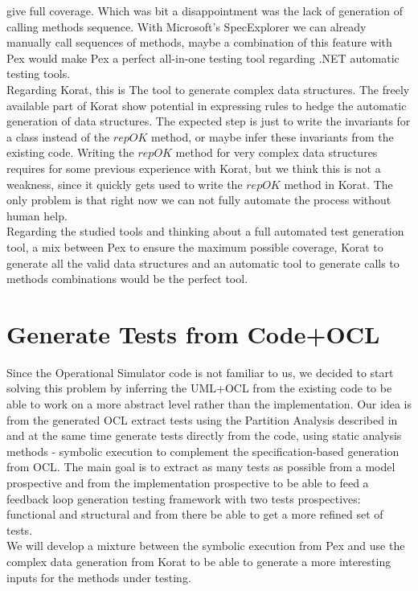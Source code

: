 \documentclass[10pt, conference, compsocconf]{IEEEtran}
\begin{document}
give full coverage. Which was bit a disappointment was the lack of generation of calling methods sequence. With Microsoft's SpecExplorer we can already
manually call sequences of methods, maybe a combination of this feature with Pex would make Pex a perfect all-in-one testing tool regarding .NET automatic testing tools.\\
Regarding Korat, this is The tool to generate complex data structures. The freely available part of Korat show potential in expressing rules to hedge
the automatic generation of data structures. The expected step is just to write the invariants for a class instead of the $repOK$ method, or maybe infer these invariants 
from the existing code. Writing the $repOK$ method for very complex data structures requires for some previous experience with Korat, but we think
this is not a weakness, since it quickly gets used to write the $repOK$ method in Korat. The only problem is that right now we can not fully automate the process
without human help.\\

Regarding the studied tools and thinking about a full automated test generation tool, a mix between Pex to ensure the maximum possible coverage, 
Korat to generate all the valid data structures and an automatic tool to generate calls to methods combinations would be the perfect tool.

\section{Generate Tests from Code+OCL}\label{proposal}
Since the Operational Simulator code is not familiar to us, we decided to start solving this problem by inferring the UML+OCL from the existing code
to be able to work on a more abstract level rather than the implementation. Our idea is from the generated OCL extract tests using the Partition Analysis described
in \cite{Benattou02generatingtest} and at the same time generate tests directly from the code, using static analysis methods - symbolic execution to complement
the specification-based generation from OCL. The main goal is to extract as many tests as possible from a model prospective and from the implementation prospective
to be able to feed a feedback loop\cite{Xie03mutuallyenhancing} generation testing framework with two tests prospectives: functional and structural and from there
be able to get a more refined set of tests.\\
We will develop a mixture between the symbolic execution from Pex and use the complex data generation from Korat to be able to generate a more interesting inputs for
the methods under testing.
\end{document}
